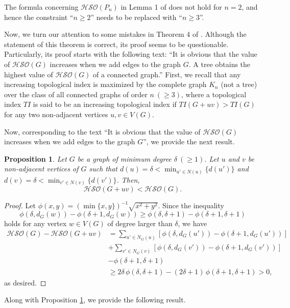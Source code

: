 \documentclass[12pt,a4paper]{article}
\newtheorem{proposition}{Proposition}[section]
\begin{document}
The formula concerning $\mathcal{HSO}(P_n)$ in Lemma 1 of \cite{Barman-MATCH-26} does not hold for $n=2$, and hence the constraint ``$n\ge2$'' needs to be replaced with ``$n\ge3$''.

Now, we turn our attention to some mistakes in Theorem 4 of \cite{Barman-MATCH-26}. Although the statement of this theorem is correct, its proof seems to be questionable. Particularly, its proof starts with the following text: ``It is obvious that the value of $\mathcal{HSO}(G)$ increases when we add edges
to the graph $G$. A tree obtains the highest value of $\mathcal{HSO}(G)$ of a connected graph.'' First, we recall that any increasing topological index is maximized by the complete graph $K_n$ (not a tree) over the class of all connected graphs of order $n\ (\ge3)$, where a topological index $TI$ is said to be an increasing topological index if $TI(G+uv)>TI(G)$ for any two non-adjacent vertices $u,v\in V(G)$.

Now, corresponding to the text ``It is obvious that the value of $\mathcal{HSO}(G)$ increases when we add edges
to the graph $G$'', we provide the next result.

\begin{proposition}\label{prop-G+uv<G}
Let $G$ be a graph of minimum degree $\delta~(\ge1)$. Let $u$ and $v$ be non-adjacent vertices of $G$ such that $d(u)=\delta< \min_{u'\in N(u)}\{d(u')\}$ and $d(v)=\delta < \min_{v'\in N(v)}\{d(v')\}$. Then,
$$
\mathcal{HSO}(G+uv)
< \mathcal{HSO}(G).
$$
\end{proposition}

\begin{proof}
Let
$\phi(x,y)= (\min\{x,y\})^{-1}\sqrt{x^2+y^2}$. Since the inequality
\[
\phi(\delta,d_G(w))-\phi(\delta+1,d_G(w))\ge\phi(\delta,\delta+1)-\phi(\delta+1,\delta+1)
\]
holds for any vertex $w\in V(G)$ of degree larger than $\delta$, we have
\begin{align*}
\mathcal{HSO}(G)-\mathcal{HSO}(G+uv)
&= \sum_{u'\in N_G(u)}[\phi(\delta,d_G(u'))-\phi(\delta+1,d_G(u'))]\\[2mm]
&+ \sum_{v'\in N_G(v)}[\phi(\delta,d_G(v'))-\phi(\delta+1,d_G(v'))] \\
& - \phi(\delta+1,\delta+1)\\[2mm]
&\ge 2\delta\,\phi(\delta,\delta+1)-(2\delta+1)\,\phi(\delta+1,\delta+1)>0,
\end{align*}
as desired.
\end{proof}

Along with Proposition \ref{prop-G+uv<G}, we provide the following result.
\end{document}
